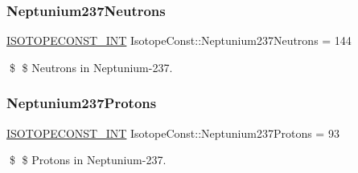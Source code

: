 \subsubsection{\texorpdfstring{Neptunium237\+Neutrons}{Neptunium237Neutrons}}
{\footnotesize\ttfamily \mbox{\hyperlink{group___isotope_const-_macros_ga5f18360b3e99483a35c32d789e62621c}{I\+S\+O\+T\+O\+P\+E\+C\+O\+N\+S\+T\+\_\+\+I\+NT}} Isotope\+Const\+::\+Neptunium237\+Neutrons = 144}

\$ \$ Neutrons in Neptunium-\/237. \mbox{\label{group___isotope_const-_neptunium-_np237_gabff24921e9f950a636fb73effafca0da}} 
\subsubsection{\texorpdfstring{Neptunium237\+Protons}{Neptunium237Protons}}
{\footnotesize\ttfamily \mbox{\hyperlink{group___isotope_const-_macros_ga5f18360b3e99483a35c32d789e62621c}{I\+S\+O\+T\+O\+P\+E\+C\+O\+N\+S\+T\+\_\+\+I\+NT}} Isotope\+Const\+::\+Neptunium237\+Protons = 93}

\$ \$ Protons in Neptunium-\/237. 